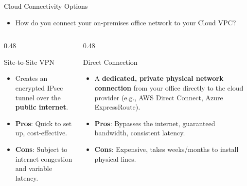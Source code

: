 \documentclass[aspectratio=169]{beamer}  %
\begin{document}
\begin{frame}[t]{Cloud Connectivity Options}
    \begin{itemize}
        \item How do you connect your on-premises office network to your Cloud VPC?
    \end{itemize}
    \vspace{0.3em}
    \begin{columns}[T]
        \begin{column}{0.48\textwidth}
            \begin{block}{Site-to-Site VPN}
                \footnotesize
                \begin{itemize}
                    \item Creates an encrypted IPsec tunnel over the \textbf{public internet}.
                    \item \textbf{Pros}: Quick to set up, cost-effective.
                    \item \textbf{Cons}: Subject to internet congestion and variable latency.
                \end{itemize}
            \end{block}
        \end{column}
        \begin{column}{0.48\textwidth}
            \begin{block}{Direct Connection}
                \footnotesize
                \begin{itemize}
                    \item A \textbf{dedicated, private physical network connection} from your office directly to the cloud provider (e.g., AWS Direct Connect, Azure ExpressRoute).
                    \item \textbf{Pros}: Bypasses the internet, guaranteed bandwidth, consistent latency.
                    \item \textbf{Cons}: Expensive, takes weeks/months to install physical lines.
                \end{itemize}
            \end{block}
        \end{column}
    \end{columns}
\end{frame}
\end{document}
